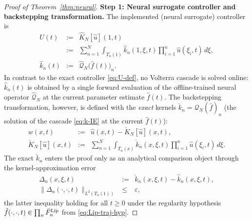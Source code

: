 \documentclass[journal,twoside,web]{ieeecolor}
\begin{document}
\begin{proof}[Proof of Theorem~\ref{thm:neural}]
\medskip\noindent\textbf{Step 1: Neural surrogate controller and backstepping transformation.}
The implemented (neural surrogate) controller is
\begin{eqnarray}
U(t) &:=& \hat K_N[\hat u](1,t) \nonumber\\
&:=& \sum_{n=1}^N\int_{T_n(1)}\hat k_n(1,\xi,t)\prod_{i=1}^n\hat u(\xi_i,t)\,d\xi, \nonumber\\
\hat k_n(t) &:=& \widehat{\mathcal Q}_N\bigl(\hat f(t)\bigr)_n. \label{eq:Uhat-def}
\end{eqnarray}
In contrast to the exact controller \eqref{eq:U-def}, no Volterra cascade is solved online: $\hat k_n(t)$ is obtained by a single forward evaluation of the offline-trained neural operator $\widehat{\mathcal Q}_N$ at the current parameter estimate $\hat f(t)$. The backstepping transformation, however, is defined with the \emph{exact} kernels $\check k_n=\mathcal Q_N(\hat f)_n$ (the solution of the cascade \eqref{eq:k-IE} at the current $\hat f(t)$):
\begin{eqnarray}
w(x,t) &:=& \hat u(x,t)-\check K_N[\hat u](x,t), \nonumber\\
\check K_N[\hat u](x,t) &:=& \sum_{n=1}^N\int_{T_n(x)}\check k_n(x,\xi,t)\prod_{i=1}^n\hat u(\xi_i,t)\,d\xi. \label{eq:w-def-passive}
\end{eqnarray}
The exact $\check k_n$ enters the proof only as an analytical comparison object through the kernel-approximation error
\begin{eqnarray}
\Delta_n(x,\xi,t) &:=& \check k_n(x,\xi,t)-\hat k_n(x,\xi,t), \nonumber\\
\|\Delta_n(\cdot,\cdot,t)\|_{L^2(T_n(1))} &\le& \varepsilon, \label{eq:Delta-def}
\end{eqnarray}
the latter inequality holding for all $t\ge 0$ under the regularity hypothesis $\hat f(\cdot,\cdot,t)\in\prod_n \bar F_n^{\rm Lip}$ from \eqref{eq:Lip-traj-hyp}.


\end{proof}
\end{document}
